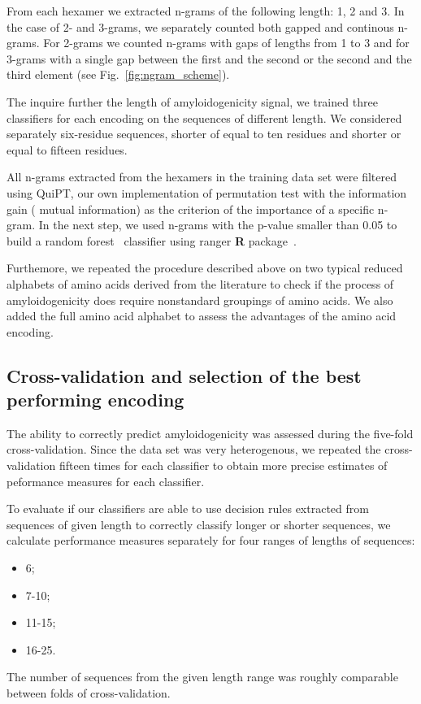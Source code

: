 \documentclass{bioinfo}
\begin{document}
\begin{methods}
From each hexamer we extracted n-grams of the following length: 1, 2 and 3. In the case of 2- and 3-grams, we separately counted both gapped and continous n-grams. For 2-grams we counted n-grams with gaps of lengths from 1 to 3 and for 3-grams with a single gap between the first and the second or the second and the third element (see Fig.~\ref{fig:ngram_scheme}).

The inquire further the length of amyloidogenicity signal, we trained three classifiers for each encoding on the sequences of different length. We considered separately six-residue sequences, shorter of equal to ten residues and shorter or equal to fifteen residues.

All n-grams extracted from the hexamers in the training data set were filtered using QuiPT, our own implementation of permutation test with the information gain ( mutual information) as the criterion of the importance of a specific n-gram. In the next step, we used n-grams with the p-value smaller than 0.05 to build a random forest~\citep{breiman_random_2001} classifier using ranger \textbf{R} package~\citep{wright_ranger:_2015}. 

Furthemore, we repeated the procedure described above on two typical reduced alphabets of amino acids derived from the literature to check if the process of amyloidogenicity does require nonstandard groupings of amino acids. We also added the full amino acid alphabet to assess the advantages of the amino acid encoding.

\subsection{Cross-validation and selection of the best performing encoding}

The ability to correctly predict amyloidogenicity was assessed during the five-fold cross-validation. Since the data set was very heterogenous,  we repeated the cross-validation fifteen times for each classifier to obtain more precise estimates of peformance measures for each classifier. 

To evaluate if our classifiers are able to use decision rules extracted from sequences of given length to correctly classify longer or shorter sequences, we calculate performance measures separately for four ranges of lengths of sequences:  
\begin{itemize}
\item 6;  
\item 7-10;   
\item 11-15;   
\item 16-25.  
\end{itemize}
The number of sequences from the given length range was roughly comparable between folds of cross-validation.


\end{methods}
\end{document}
